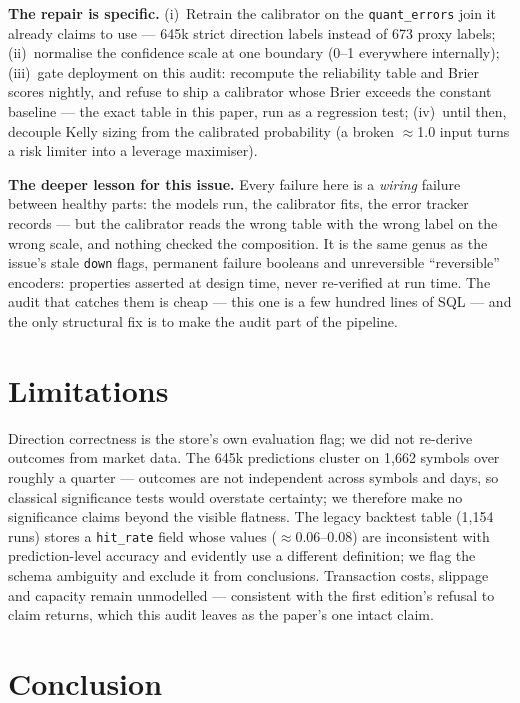 \documentclass[10pt]{article}
\begin{document}
\textbf{The repair is specific.} (i)~Retrain the calibrator on the \texttt{quant\_errors} join it already claims to use --- 645k strict direction labels instead of 673 proxy labels; (ii)~normalise the confidence scale at one boundary (0--1 everywhere internally); (iii)~gate deployment on this audit: recompute the reliability table and Brier scores nightly, and refuse to ship a calibrator whose Brier exceeds the constant baseline --- the exact table in this paper, run as a regression test; (iv)~until then, decouple Kelly sizing from the calibrated probability (a broken $\approx$1.0 input turns a risk limiter into a leverage maximiser).

\textbf{The deeper lesson for this issue.} Every failure here is a \emph{wiring} failure between healthy parts: the models run, the calibrator fits, the error tracker records --- but the calibrator reads the wrong table with the wrong label on the wrong scale, and nothing checked the composition. It is the same genus as the issue's stale \texttt{down} flags, permanent failure booleans and unreversible ``reversible'' encoders: properties asserted at design time, never re-verified at run time. The audit that catches them is cheap --- this one is a few hundred lines of SQL --- and the only structural fix is to make the audit part of the pipeline.

\section{Limitations}
\label{sec:limitations}

Direction correctness is the store's own evaluation flag; we did not re-derive outcomes from market data. The 645k predictions cluster on 1{,}662 symbols over roughly a quarter --- outcomes are not independent across symbols and days, so classical significance tests would overstate certainty; we therefore make no significance claims beyond the visible flatness. The legacy backtest table (1{,}154 runs) stores a \texttt{hit\_rate} field whose values ($\approx$0.06--0.08) are inconsistent with prediction-level accuracy and evidently use a different definition; we flag the schema ambiguity and exclude it from conclusions. Transaction costs, slippage and capacity remain unmodelled --- consistent with the first edition's refusal to claim returns, which this audit leaves as the paper's one intact claim.

\section{Conclusion}
\label{sec:conclusion}
\end{document}
